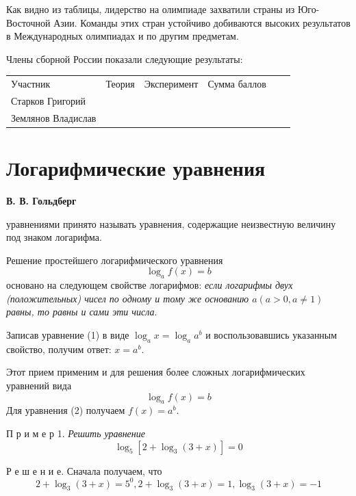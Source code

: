 \begin{multicols*}{2}
    Как видно из таблицы, лидерство на олимпиаде захватили страны из Юго-Восточной Азии. Команды этих стран устойчиво добиваются высоких результатов в Международных олимпиадах и по другим предметам.

    Члены сборной России показали следующие результаты:
    \begin{center}
        \begin{tabular}{p{1.9cm}p{1.3cm}p{2cm}p{1.1cm}p{2cm}c}
             Участник & Теория & Эксперимент & Сумма баллов & \centering{Медаль} & \\
             Старков Григорий & \centering{21,45} & \centering{14,00} & \centering{35,45} & \centering{золото} & \\
             
             Землянов Владислав & \centering{20,60} & \centering{13,65} & \centering{34,75} & \centering{золото} & \\
             
        \end{tabular}
    \end{center}
\end{multicols*}

\section*{\centering Логарифмические уравнения}
\flushright \textbf{В. В. Гольдберг}

 уравнениями принято называть уравнения, содержащие неизвестную величину под знаком логарифма.

Решение простейшего логарифмического уравнения
\begin{equation}
    \log_af(x)=b
\end{equation}
основано на следующем свойстве логарифмов: \textit{если логарифмы двух (положительных) чисел по одному и тому же основанию $a(a>0, a\neq1)$ равны, то равны и сами эти числа}.

Записав уравнение (1) в виде $\log_ax=\log_aa^b$ и воспользовавшись указанным свойство, получим ответ: $x=a^b$.

Этот прием применим и для решения более сложных логарифмических уравнений вида
\begin{equation}
    \log_af(x)=b
\end{equation}
Для уравнения (2) получаем $f(x)=a^b$.

П р и м е р 1. \textit{Решить уравнение}
\begin{equation*}
    \log_5[2+\log_3(3+x)]=0
\end{equation*}

Р е ш е н и е. Сначала получаем, что
\begin{equation*}
    2+\log_3(3+x)=5^0, 2+\log_3(3+x)=1,\log_3(3+x)=-1
\end{equation*}
